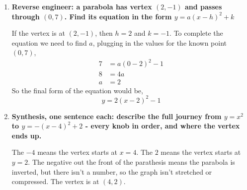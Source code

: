 \documentclass{article}
\begin{document}
\begin{enumerate}[itemsep=12pt]
    At $x = 3$,
    \begin{align*}
      y &= ((3) + 3)^{2} \\
      y &= 36
    \end{align*}
    At $x = 2$, $y = 25$ and at $x = 4$, $y = 49$, so it is clear that $x = 3$ can't be the vertex, as the $y$ values
    for $x = 2$ and $x = 4$ aren't the same. The vertex will be at $x = -3$, as
    \begin{align*}
      y &= ((-3) + 3)^{2} \\
      y &= (0)^{2}
    \end{align*}
    To check, $x = -4$, $y = 1$, should be equal to, $x = -2$, $y = 1$. So the vertex is at $(-3,0)$.
    The student most likely forgot the negative in front of the $3$.

  \item \textbf{Reverse engineer: a parabola has vertex $(2, -1)$ and passes through $(0,7)$.
    Find its equation in the form $y = a(x-h)^{2} +k$}

    If the vertex is at $(2, -1)$, then $h = 2$ and $k = -1$. To complete the equation we need to find $a$,
    plugging in the values for the known point $(0,7)$, 
    \begin{align*}
      7 &= a(0-2)^{2}-1 \\
      8 &= 4a \\
      a &= 2 
    \end{align*}
    So the final form of the equation would be,
    \[
      y = 2(x-2)^{2} - 1
    \]
    
  \item \textbf{Synthesis, one sentence each: describe the full journey from $y = x^{2}$ to $y = -(x-4)^{2} + 2$ -
    every knob in order, and where the vertex ends up.} 

    The $-4$ means the vertex starts at $x = 4$. The $2$ means the vertex starts at $y = 2$.
    The negative out the front of the parathesis means the parabola is inverted, but there isn't a number,
    so the graph isn't stretched or compressed. The vertex is at $(4,2)$.
    
    
\end{enumerate}
\end{document}
